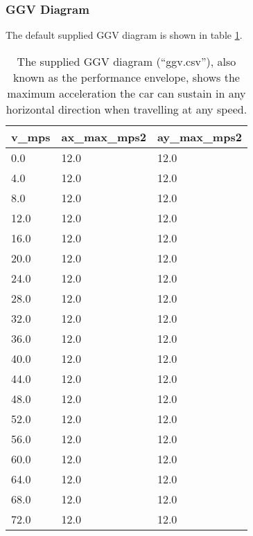 \subsubsection{GGV Diagram} \label{sec:Appendix GGV Diagram}
The default supplied GGV diagram is shown in table \ref{tab:GGV Diagram}.
\begin{table}[H]
    \centering
    \begin{tabular}{|l|l|l|}
        \hline
        \textbf{v\_mps} & \textbf{ax\_max\_mps2} & \textbf{ay\_max\_mps2} \\ \hline
        0.0             & 12.0                   & 12.0                   \\ \hline
        4.0             & 12.0                   & 12.0                   \\ \hline
        8.0             & 12.0                   & 12.0                   \\ \hline
        12.0            & 12.0                   & 12.0                   \\ \hline
        16.0            & 12.0                   & 12.0                   \\ \hline
        20.0            & 12.0                   & 12.0                   \\ \hline
        24.0            & 12.0                   & 12.0                   \\ \hline
        28.0            & 12.0                   & 12.0                   \\ \hline
        32.0            & 12.0                   & 12.0                   \\ \hline
        36.0            & 12.0                   & 12.0                   \\ \hline
        40.0            & 12.0                   & 12.0                   \\ \hline
        44.0            & 12.0                   & 12.0                   \\ \hline
        48.0            & 12.0                   & 12.0                   \\ \hline
        52.0            & 12.0                   & 12.0                   \\ \hline
        56.0            & 12.0                   & 12.0                   \\ \hline
        60.0            & 12.0                   & 12.0                   \\ \hline
        64.0            & 12.0                   & 12.0                   \\ \hline
        68.0            & 12.0                   & 12.0                   \\ \hline
        72.0            & 12.0                   & 12.0                   \\ \hline
    \end{tabular}
    \caption{The supplied GGV diagram (``ggv.csv''), also known as the performance envelope, shows the maximum acceleration the car can sustain in any horizontal direction when travelling at any speed.}
    \label{tab:GGV Diagram}
\end{table}

